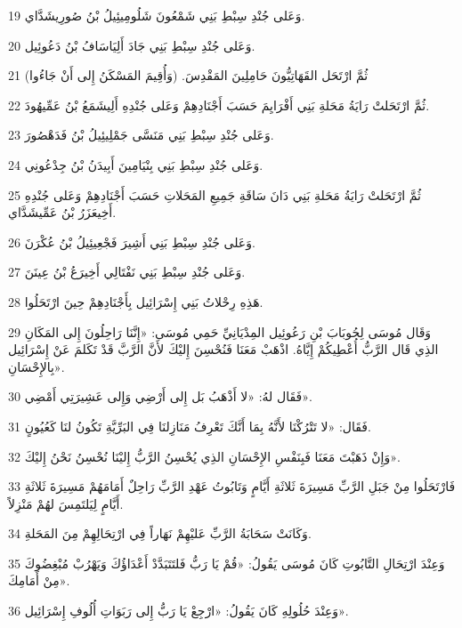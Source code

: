 \par 19 وَعَلى جُنْدِ سِبْطِ بَنِي شَمْعُونَ شَلُومِيئِيلُ بْنُ صُورِيشَدَّاي.
\par 20 وَعَلى جُنْدِ سِبْطِ بَنِي جَادَ أَلِيَاسَافُ بْنُ دَعُوئِيل.
\par 21 ثُمَّ ارْتَحَل القَهَاتِيُّونَ حَامِلِينَ المَقْدِسَ. (وَأُقِيمَ المَسْكَنُ إِلى أَنْ جَاءُوا)
\par 22 ثُمَّ ارْتَحَلتْ رَايَةُ مَحَلةِ بَنِي أَفْرَايِمَ حَسَبَ أَجْنَادِهِمْ وَعَلى جُنْدِهِ أَلِيشَمَعُ بْنُ عَمِّيهُودَ.
\par 23 وَعَلى جُنْدِ سِبْطِ بَنِي مَنَسَّى جَمْلِيئِيلُ بْنُ فَدَهْصُورَ.
\par 24 وَعَلى جُنْدِ سِبْطِ بَنِي بِنْيَامِينَ أَبِيدَنُ بْنُ جِدْعُونِي.
\par 25 ثُمَّ ارْتَحَلتْ رَايَةُ مَحَلةِ بَنِي دَانَ سَاقَةِ جَمِيعِ المَحَلاتِ حَسَبَ أَجْنَادِهِمْ وَعَلى جُنْدِهِ أَخِيعَزَرُ بْنُ عَمِّيشَدَّاي.
\par 26 وَعَلى جُنْدِ سِبْطِ بَنِي أَشِيرَ فَجْعِيئِيلُ بْنُ عُكْرَنَ.
\par 27 وَعَلى جُنْدِ سِبْطِ بَنِي نَفْتَالِي أَخِيرَعُ بْنُ عِينَنَ.
\par 28 هَذِهِ رِحْلاتُ بَنِي إِسْرَائِيل بِأَجْنَادِهِمْ حِينَ ارْتَحَلُوا.
\par 29 وَقَال مُوسَى لِحُوبَابَ بْنِ رَعُوئِيل المِدْيَانِيِّ حَمِي مُوسَى: «إِنَّنَا رَاحِلُونَ إِلى المَكَانِ الذِي قَال الرَّبُّ أُعْطِيكُمْ إِيَّاهُ. اذْهَبْ مَعَنَا فَنُحْسِنَ إِليْكَ لأَنَّ الرَّبَّ قَدْ تَكَلمَ عَنْ إِسْرَائِيل بِالإِحْسَانِ».
\par 30 فَقَال لهُ: «لا أَذْهَبُ بَل إِلى أَرْضِي وَإِلى عَشِيرَتِي أَمْضِي».
\par 31 فَقَال: «لا تَتْرُكْنَا لأَنَّهُ بِمَا أَنَّكَ تَعْرِفُ مَنَازِلنَا فِي البَرِّيَّةِ تَكُونُ لنَا كَعُيُونٍ.
\par 32 وَإِنْ ذَهَبْتَ مَعَنَا فَبِنَفْسِ الإِحْسَانِ الذِي يُحْسِنُ الرَّبُّ إِليْنَا نُحْسِنُ نَحْنُ إِليْكَ».
\par 33 فَارْتَحَلُوا مِنْ جَبَلِ الرَّبِّ مَسِيرَةَ ثَلاثَةِ أَيَّامٍ وَتَابُوتُ عَهْدِ الرَّبِّ رَاحِلٌ أَمَامَهُمْ مَسِيرَةَ ثَلاثَةِ أَيَّامٍ لِيَلتَمِسَ لهُمْ مَنْزِلاً.
\par 34 وَكَانَتْ سَحَابَةُ الرَّبِّ عَليْهِمْ نَهَاراً فِي ارْتِحَالِهِمْ مِنَ المَحَلةِ.
\par 35 وَعِنْدَ ارْتِحَالِ التَّابُوتِ كَانَ مُوسَى يَقُولُ: «قُمْ يَا رَبُّ فَلتَتَبَدَّدْ أَعْدَاؤُكَ وَيَهْرُبْ مُبْغِضُوكَ مِنْ أَمَامِكَ».
\par 36 وَعِنْدَ حُلُولِهِ كَانَ يَقُولُ: «ارْجِعْ يَا رَبُّ إِلى رَبَوَاتِ أُلُوفِ إِسْرَائِيل».

